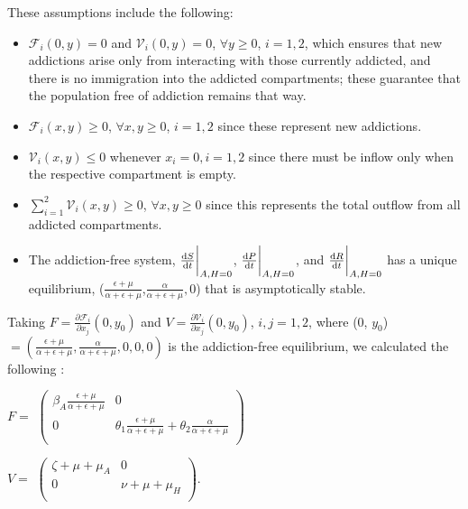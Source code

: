 \documentclass[12pt]{article}
\begin{document}
These assumptions include the following: 
\begin{itemize}
\item $\mathscr{F}_{i} (0,y)=0$ and $\mathscr{V}_{i}(0,y)=0$,  $\forall$$y \geq 0$, $i=1,2$, which ensures that new addictions arise only from interacting with those currently addicted, and there is no immigration into the addicted compartments; these guarantee that the population free of addiction remains that way. 
\item $\mathscr{F}_{i} (x,y) \geq 0$, $\forall$$x,y \geq 0$, $i=1,2$ since these represent new addictions. 
\item $\mathscr{V}_{i}(x,y) \leq 0$ whenever $x_i=0, i=1,2$ since there must be inflow only when the respective compartment is empty. 
\item $\sum_{i=1}^{2} \mathscr{V}_{i}(x,y) \geq 0$, $\forall x,y \geq 0$ since this represents the total outflow from all addicted compartments. 
\item The addiction-free system, $\dv{S}{t}\bigg|_{A,H=0}$, $\dv{P}{t}\bigg|_{A,H=0}$, and $\dv{R}{t}\bigg|_{A,H=0}$ has a unique equilibrium, ($\frac{\epsilon+\mu}{\alpha+\epsilon+\mu}$,$\frac{\alpha}{\alpha+\epsilon+\mu},0$) that is asymptotically stable. 
\end{itemize}

Taking $F=\frac{\partial \mathscr{F}_i}{\partial x_j} (0, y_0)$ and $V=\frac{\partial \mathscr{V}_i}{\partial x_j} (0, y_0)$, $i, j =1, 2$, where (0, $y_{0}$) $=(\frac{\epsilon + \mu}{\alpha + \epsilon +\mu},\frac{\alpha}{\alpha + \epsilon +\mu},0,0,0)$ is the addiction-free equilibrium, we calculated the following \cite{Driessche}: 



\begin{center}
$F=$
$ \begin{pmatrix}

\beta_{A} \frac{\epsilon+\mu}{\alpha+\epsilon+\mu} &  0  \\
0 & \theta_1 \frac{\epsilon+\mu}{\alpha+\epsilon+\mu}  +\theta_2 \frac{\alpha}{\alpha+\epsilon+\mu}  \\
\end{pmatrix}$



$V=$
$ \begin{pmatrix}

\zeta +\mu +\mu_A &  0  \\
0 &  \nu+\mu+\mu_H \\

\end{pmatrix}$.
\end{center}
\end{document}
